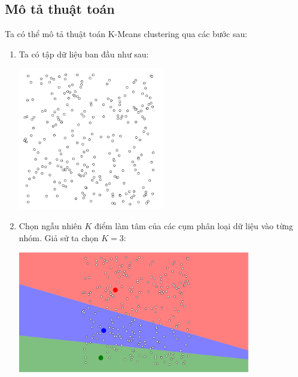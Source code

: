 \subsection{Mô tả thuật toán}
Ta có thể mô tả thuật toán K-Means clustering qua các bước sau:
\begin{enumerate}
	\item Ta có tập dữ liệu ban đầu như sau:
	      \begin {center}
	      \includegraphics[width=0.5\textwidth]{images/kmean/1.png}
	      \end{center}

	\item Chọn ngẫu nhiên $K$ điểm làm tâm của các cụm  phân loại dữ liệu vào từng nhóm. Giả sử ta chọn $K = 3$:
	      \begin{center}
		      \includegraphics[width=0.8\textwidth]{images/kmean/2.png}
	      \end{center}


\end{enumerate}
